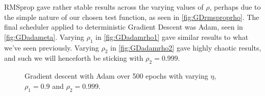 \documentclass{article}
\theoremstyle{definition}
\begin{document}
RMSprop gave rather stable results across the varying values of $\rho$, perhaps due to the simple nature of our chosen test function, as seen in \autoref{fig:GDrmsproprho}. The final scheduler applied to deterministic Gradient Descent was Adam, seen in \autoref{fig:GDadameta}. Varying $\rho_1$ in \autoref{fig:GDadamrho1} gave similar results to what we've seen previously. Varying $\rho_2$ in \autoref{fig:GDadamrho2} gave highly chaotic results, and such we will henceforth be sticking with $\rho_2 = 0.999$.

\begin{figure}[H]%
    \centering
    \qquad
    \caption{Gradient descent with Adam over 500 epochs with varying $\eta$, $\rho_1=0.9$ and $\rho_2=0.999$.}%
    \label{fig:GDadameta}%
\end{figure}
\end{document}
